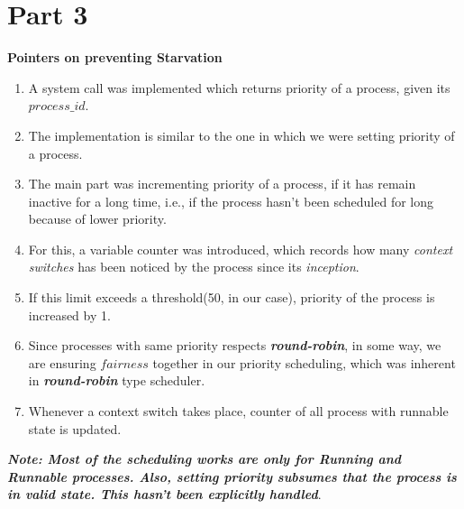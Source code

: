\documentclass{article}
\newcommand{\bld}[1]{\textbf{#1}}
\newcommand{\ital}[1]{\textit{#1}}
\newcommand{\italb}[1]{\textbf{\textit{#1}}}
\begin{document}
\section*{Part 3}
\bld{Pointers on preventing Starvation}
\begin{enumerate}
	\item A system call was implemented which returns priority of a process, given its $process\_id$.
	\item The implementation is similar to the one in which we were setting priority of a process.
	\item The main part was incrementing priority of a process, if it has remain inactive for a long time, i.e., if the process hasn't been scheduled for long because of lower priority.
	\item For this, a variable counter was introduced, which records how many \ital{context switches} has been noticed by the process since its \ital{inception}.
	\item If this limit exceeds a threshold(50, in our case), priority of the process is increased by 1.
	\item Since processes with same priority respects \italb{round-robin}, in some way, we are ensuring $fairness$ together in our priority scheduling, which was inherent in \italb{round-robin} type scheduler.
	\item Whenever a context switch takes place, counter of all process with runnable state is updated.
\end{enumerate}

\italb{Note: Most of the scheduling works are only for Running and Runnable processes. Also, setting priority subsumes that the process is in valid state. This hasn't been explicitly handled}.
\end{document}
